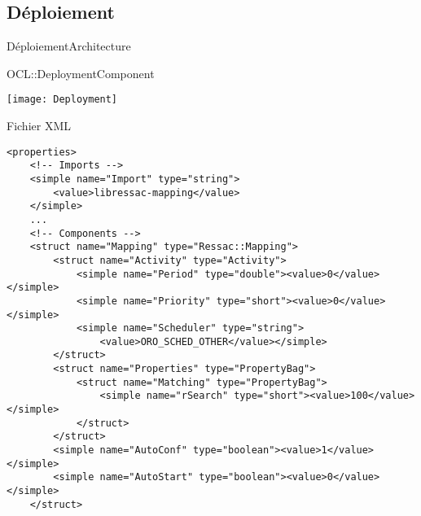 \documentclass[compress]{beamer}
\begin{document}
\subsection{Déploiement}
\begin{frame}{Déploiement}{Architecture}
\begin{center}
\end{center}
\end{frame}

\begin{frame}{OCL::DeploymentComponent}
\begin{center}
\texttt{[image: Deployment]}
\end{center}
\end{frame}

\begin{frame}[containsverbatim]{Fichier XML}
\lstset{language=XML,basicstyle=\tiny,tabsize=1}
\begin{lstlisting}[frame=trBL]
<properties>
	<!-- Imports -->
	<simple name="Import" type="string">
		<value>libressac-mapping</value>
	</simple>
	...
	<!-- Components -->
	<struct name="Mapping" type="Ressac::Mapping">
		<struct name="Activity" type="Activity">
			<simple name="Period" type="double"><value>0</value></simple>
			<simple name="Priority" type="short"><value>0</value></simple>
			<simple name="Scheduler" type="string">
				<value>ORO_SCHED_OTHER</value></simple>
		</struct>
		<struct name="Properties" type="PropertyBag">
			<struct name="Matching" type="PropertyBag">
				<simple name="rSearch" type="short"><value>100</value></simple>
			</struct>
		</struct>
		<simple name="AutoConf" type="boolean"><value>1</value></simple>
		<simple name="AutoStart" type="boolean"><value>0</value></simple>
	</struct>
\end{lstlisting}
\end{frame}
\end{document}
